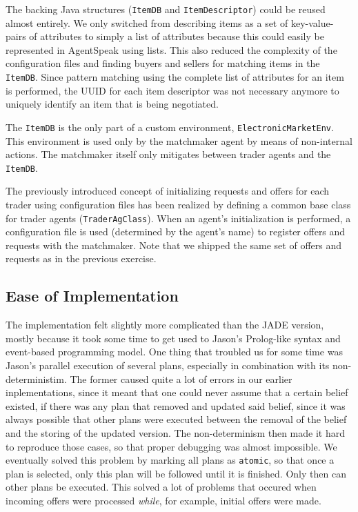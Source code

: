 \documentclass[a4paper,11pt]{article}
\begin{document}
\noindent The backing Java structures (\texttt{ItemDB} and \texttt{ItemDescriptor}) could be reused almost entirely. We only switched from describing items as a set of key-value-pairs of attributes to simply a list of attributes because this could easily be represented in AgentSpeak using lists. This also reduced the complexity of the configuration files and finding buyers and sellers for matching items in the \texttt{ItemDB}. Since pattern matching using the complete list of attributes for an item is performed, the UUID for each item descriptor was not necessary anymore to uniquely identify an item that is being negotiated.

The \texttt{ItemDB} is the only part of a custom environment, \texttt{ElectronicMarketEnv}. This environment is used only by the matchmaker agent by means of non-internal actions. The matchmaker itself only mitigates between trader agents and the \texttt{ItemDB}.

The previously introduced concept of initializing requests and offers for each trader using configuration files has been realized by defining a common base class for trader agents (\texttt{TraderAgClass}). When an agent's initialization is performed, a configuration file is used (determined by the agent's name) to register offers and requests with the matchmaker. Note that we shipped the same set of offers and requests as in the previous exercise.


\subsection{Ease of Implementation}
The implementation felt slightly more complicated than the JADE version, mostly because it took some time to get used to Jason's Prolog-like syntax and event-based programming model. One thing that troubled us for some time was Jason's parallel execution of several plans, especially in combination with its non-deterministim. The former caused quite a lot of errors in our earlier inplementations, since it meant that one could never assume that a certain belief existed, if there was any plan that removed and updated said belief, since it was always possible that other plans were executed between the removal of the belief and the storing of the updated version. The non-determinism then made it hard to reproduce those cases, so that proper debugging was almost impossible. We eventually solved this problem by marking all plans as \texttt{atomic}, so that once a plan is selected, only this plan will be followed until it is finished. Only then can other plans be executed. This solved a lot of problems that occured when incoming offers were processed \emph{while}, for example, initial offers were made.
\end{document}
